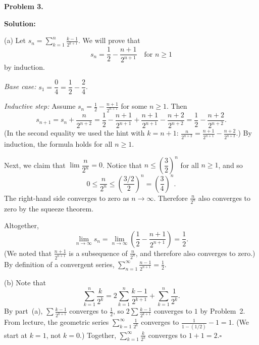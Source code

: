 \documentclass[12pt]{article}
\begin{document}
\newpage

\begin{tcolorbox}[
  enhanced, breakable,
  colback  = solgreen,
  colframe = green!45!black,
  fonttitle = \bfseries,
  title = {\textsc{Official Solution}\hfill Homework 6 -- Selected Solutions}
]
\textbf{Problem 3.}

\medskip\textbf{Solution:}

\medskip
(a) Let $s_n = \sum_{k=1}^{n} \frac{k-1}{2^{k+1}}$.
We will prove that
\[
  s_n = \frac{1}{2} - \frac{n+1}{2^{n+1}} \quad \text{for } n \geq 1
\]
by induction.

\textit{Base case:}
$s_1 = \dfrac{0}{4} = \dfrac{1}{2} - \dfrac{2}{4}$. \checkmark

\textit{Inductive step:}
Assume $s_n = \frac{1}{2} - \frac{n+1}{2^{n+1}}$ for some $n \geq 1$.
Then
\[
  s_{n+1}
  = s_n + \frac{n}{2^{n+2}}
  = \frac{1}{2} - \frac{n+1}{2^{n+1}} + \frac{n+1}{2^{n+1}} - \frac{n+2}{2^{n+2}}
  = \frac{1}{2} - \frac{n+2}{2^{n+2}}.
\]
(In the second equality we used the hint with $k = n+1$:
$\frac{n}{2^{n+2}} = \frac{n+1}{2^{n+1}} - \frac{n+2}{2^{n+2}}$.)
By induction, the formula holds for all $n \geq 1$.

Next, we claim that $\lim \dfrac{n}{2^n} = 0$.
Notice that $n \leq \left(\dfrac{3}{2}\right)^{n}$ for all $n \geq 1$, and so
\[
  0 \leq \frac{n}{2^n} \leq \left(\frac{3/2}{2}\right)^n = \left(\frac{3}{4}\right)^n.
\]
The right-hand side converges to zero as $n \to \infty$.
Therefore $\frac{n}{2^n}$ also converges to zero by the squeeze theorem.

Altogether,
\[
  \lim_{n\to\infty} s_n
  = \lim_{n\to\infty}\!\left(\frac{1}{2} - \frac{n+1}{2^{n+1}}\right) = \frac{1}{2}.
\]
(We noted that $\frac{n+1}{2^{n+1}}$ is a subsequence of $\frac{n}{2^n}$, and therefore
also converges to zero.)
By definition of a convergent series, $\displaystyle\sum_{n=1}^{\infty} \frac{n-1}{2^{n+1}} = \frac{1}{2}$.

\medskip
(b) Note that
\[
  \sum_{k=1}^{n} \frac{k}{2^k}
  = 2\sum_{k=1}^{n} \frac{k-1}{2^{k+1}} + \sum_{k=1}^{n} \frac{1}{2^k}.
\]
By part~(a), $\sum \frac{k-1}{2^{k+1}}$ converges to $\frac{1}{2}$, so
$2\sum \frac{k-1}{2^{k+1}}$ converges to $1$ by Problem~2.
From lecture, the geometric series $\sum_{k=1}^{\infty} \frac{1}{2^k}$
converges to $\frac{1}{1-(1/2)} - 1 = 1$.
(We start at $k=1$, not $k=0$.)
Together, $\displaystyle\sum_{k=1}^{\infty} \frac{k}{2^k}$ converges to $1 + 1 = 2$.\hfill$\square$
\end{tcolorbox}
\end{document}
